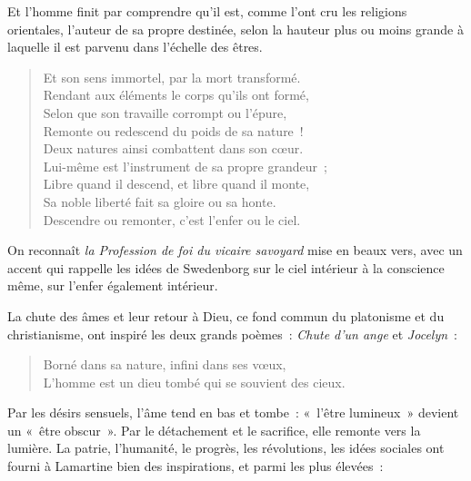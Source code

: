 \documentclass[french,twoside]{book} %
\begin{document}
\noindent Et l’homme finit par comprendre qu’il est, comme l’ont cru les religions orientales, l’auteur de sa propre destinée, selon la hauteur plus ou moins grande à laquelle il est parvenu dans l’échelle des êtres.\par


\begin{verse}
Et son sens immortel, par la mort transformé.\\
Rendant aux éléments le corps qu’ils ont formé,\\
Selon que son travaille corrompt ou l’épure,\\
Remonte ou redescend du poids de sa nature !\\
Deux natures ainsi combattent dans son cœur.\\
Lui-même est l’instrument de sa propre grandeur ;\\
Libre quand il descend, et libre quand il monte,\\
Sa noble liberté fait sa gloire ou sa honte.\\
Descendre ou remonter, c’est l’enfer ou le ciel.\\
\end{verse}

\noindent On reconnaît \emph{la Profession de foi du vicaire savoyard} mise en beaux vers, avec un accent qui rappelle les idées de Swedenborg sur le ciel intérieur à la conscience même, sur l’enfer également intérieur.\par
La chute des âmes et leur retour à Dieu, ce fond commun du platonisme et du christianisme, ont inspiré les deux grands poèmes : \emph{Chute d’un ange} et \emph{Jocelyn} :\par


\begin{verse}
Borné dans sa nature, infini dans ses vœux,\\
L’homme est un dieu tombé qui se souvient des cieux.\\
\end{verse}

\noindent Par les désirs sensuels, l’âme tend en bas et tombe : « l’être lumineux » devient un « être obscur ». Par le détachement et le sacrifice, elle remonte vers la lumière. La patrie, l’humanité, le progrès, les révolutions, les idées sociales ont fourni à Lamartine bien des inspirations, et parmi les plus élevées :\par
\end{document}
